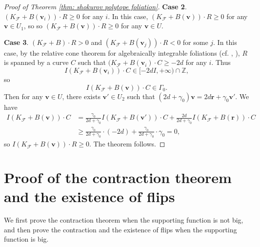 \documentclass[11pt]{amsart}
\numberwithin{equation}{section}
\newcommand{\Ff}{\mathcal{F}}
\newcommand{\Ii}{\Gamma}
\theoremstyle{definition}
\theoremstyle{definition}
\theoremstyle{definition}
\begin{document}
\begin{proof}[Proof of Theorem \ref{thm: shokurov polytope foliation}]
\medskip

    \noindent\textbf{Case 2}. $(K_{\Ff}+B(\bm{v}_i))\cdot R\geq 0$ for any $i$. In this case, $(K_{\Ff}+B(\bm{v}))\cdot R\geq 0$ for any $\bm{v}\in U_1$, so so $(K_{\Ff}+B(\bm{v}))\cdot R\geq 0$ for any $\bm{v}\in U$.

    \medskip

     \noindent\textbf{Case 3}. $(K_{\Ff}+B)\cdot R>0$ and $(K_{\Ff}+B(\bm{v}_j))\cdot R<0$ for some $j$. In this case, by the relative cone theorem for algebraically integrable foliations (cf. \cite[Theorem 2.2.1]{CHLX23}, \cite[Theorem 3.9]{ACSS21}), $R$ is spanned by a curve $C$ such that $(K_{\Ff}+B(\bm{v}_i)\cdot C\geq -2d$ for any $i$. Thus $$I(K_{\Ff}+B(\bm{v}_i))\cdot C\in [-2dI,+\infty)\cap\mathbb Z,$$
    so
    $$I(K_{\Ff}+B(\bm{v}))\cdot C\in\Ii_0.$$
    Then for any $\bm{v}\in U$, there exists $\bm{v}'\in U_2$ such that $(2d+\gamma_0)\bm{v}=2d\bm{r}+\gamma_0\bm{v}'$. We have
    \begin{align*}
        I(K_{\Ff}+B(\bm{v}))\cdot C&=\frac{\gamma_0}{2d+\gamma_0}I(K_{\Ff}+B(\bm{v}'))\cdot C+\frac{2d}{2d+\gamma_0}I(K_{\Ff}+B(\bm{r}))\cdot C\\
        &\geq \frac{\gamma_0}{2d+\gamma_0}\cdot (-2d)+\frac{\gamma_0}{2d+\gamma_0}\cdot\gamma_0=0,
    \end{align*}
    so $I(K_{\Ff}+B(\bm{v}))\cdot R\geq 0$. The theorem follows.
\end{proof}





\section{Proof of the contraction theorem and the existence of flips}\label{sec: proof flip}

We first prove the contraction theorem when the supporting function is not big, and then prove the contraction and the existence of flips when the supporting function is big.
\end{document}
